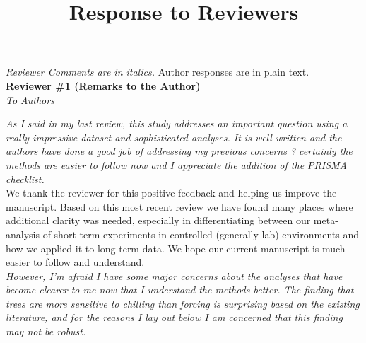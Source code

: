 \documentclass[11pt, a4paper]{article}
\newcommand{\lr}[1]{line~\lineref{#1}}
\begin{document}
{}


\setlength\parindent{0pt}


\title{Response to Reviewers}
\emph{Reviewer Comments are in italics.} Author responses are in plain text.\\

{\bf Reviewer \#1 (Remarks to the Author)}\\

\emph{To Authors}

\emph{As I said in my last review, this study addresses an important question using a really impressive
dataset and sophisticated analyses. It is well written and the authors have done a good job of
addressing my previous concerns ? certainly the methods are easier to follow now and I appreciate
the addition of the PRISMA checklist.}\\

We thank the reviewer for this positive feedback and helping us improve the manuscript. Based on this most recent review we have found many places where additional clarity was needed, especially in differentiating between our meta-analysis of short-term experiments in controlled (generally lab) environments and how we applied it to long-term data. We hope our current manuscript is much easier to follow and understand.\\

\emph{However, I'm afraid I have some major concerns about the analyses that have become clearer to me
now that I understand the methods better. The finding that trees are more sensitive to chilling than
forcing is surprising based on the existing literature, and for the reasons I lay out below I am
concerned that this finding may not be robust.}\\
\end{document}
